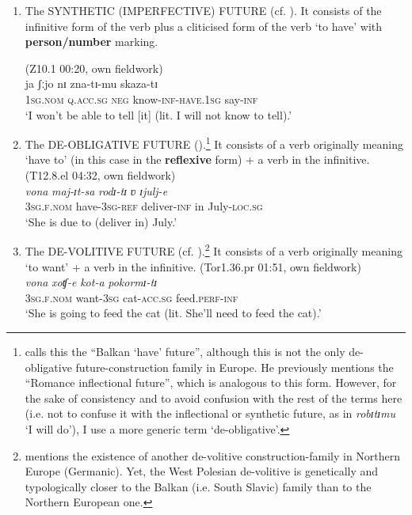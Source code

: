 \documentclass[output=paper,colorlinks,citecolor=brown]{langscibook}
\begin{document}
\begin{enumerate}
    \item The \MakeUppercase{synthetic (imperfective) future} (cf. \citealt[319]{Dahl2000b}). It consists of the infinitive form of the verb plus a cliticised form of the verb ‘to have’ with \textbf{person/number} marking.

 \ea \label{ex:roncero:1}
     (Z10.1 00:20, own fieldwork)\\
     \gll ja ʃːjo nɪ zna-tɪ-mu skaza-tɪ\\
     1\textsc{sg.nom} \textsc{q.acc.sg} \textsc{neg} know-\textsc{inf-have.1sg} say-\textsc{inf}\\
     \glt ‘I won’t be able to tell [it] (lit. I will not know to tell).’ 
 \z

 \item The \MakeUppercase{de-obligative future} (\citeyear[323]{Dahl2000b}).\footnote{\citet[318--319]{Dahl2000b} calls this the “Balkan ‘have’ future”, although this is not the only de-obligative future-construction family in Europe. He previously mentions the “Romance inflectional future”, which is analogous to this form. However, for the sake of consistency and to avoid confusion with the rest of the terms here (i.e. not to confuse it with the inflectional or synthetic future, as in \textit{robɪtɪmu} ‘I will do’), I use a more generic term ‘de-obligative’.} It consists of a verb originally meaning ‘have to’ (in this case in the \textbf{reflexive} form) + a verb in the infinitive.
 \ea \label{ex:roncero:2}
     (T12.8.el 04:32, own fieldwork)\\
     \gll \textit{vona} \textit{maj-ɪt-sa} \textit{rodɪ-tɪ} \textit{ʋ} \textit{ɪjulj-e}\\
     3\textsc{sg.f.nom} have-\textsc{3sg-ref} deliver-\textsc{inf} in July-\textsc{loc.sg}\\
     \glt ‘She is due to (deliver in) July.’  
 \z

 \item The \MakeUppercase{de-volitive future} (cf. \citealt[323]{Dahl2000b}).\footnote{\citet[322]{Dahl2000b} mentions the existence of another de-volitive construction-family in Northern Europe (Germanic). Yet, the West Polesian de-volitive is genetically and typologically closer to the Balkan (i.e. South Slavic) family than to the Northern European one.} It consists of a verb originally meaning ‘to want’ + a verb in the infinitive.
 \ea \label{ex:roncero:3}
     (Tor1.36.pr 01:51, own fieldwork)\\
     \gll \textit{vona} \textit{xoʧ-e} \textit{kot-a} \textit{pokormɪ-tɪ}\\
     3\textsc{sg.f.nom} want-\textsc{3sg} cat-\textsc{acc.sg} feed.\textsc{perf}-\textsc{inf}\\
     \glt ‘She is going to feed the cat (lit. She’ll need to feed the cat).’  
 \z


\end{enumerate}
\end{document}
